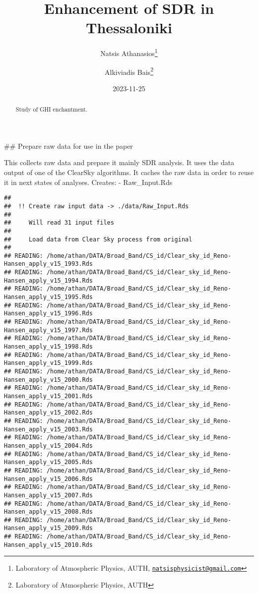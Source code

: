 \documentclass[
  10pt,
  a4paper,oneside]{article}
\title{Enhancement of SDR in Thessaloniki}
\author{Natsis Athanasios\footnote{Laboratory of Atmospheric Physics, AUTH, \href{mailto:natsisphysicist@gmail.com}{\nolinkurl{natsisphysicist@gmail.com}}} \and Alkiviadis Bais\footnote{Laboratory of Atmospheric Physics, AUTH}}
\date{2023-11-25}
\begin{document}
\maketitle
\begin{abstract}
Study of GHI enchantment.
\end{abstract}

{
\hypersetup{linkcolor=}
\setcounter{tocdepth}{4}
\tableofcontents
}
\#\# Prepare raw data for use in the paper

This collects raw data and prepare it mainly SDR analysis.
It uses the data output of one of the ClearSky algorithms.
It caches the raw data in order to reuse it in next states of analyses.
Creates:
- Raw\_Input.Rds

\begin{verbatim}
## 
##  !! Create raw input data -> ./data/Raw_Input.Rds 
## 
##     Will read 31 input files
## 
##     Load data from Clear Sky process from original
## 
## READING: /home/athan/DATA/Broad_Band/CS_id/Clear_sky_id_Reno-Hansen_apply_v15_1993.Rds 
## READING: /home/athan/DATA/Broad_Band/CS_id/Clear_sky_id_Reno-Hansen_apply_v15_1994.Rds 
## READING: /home/athan/DATA/Broad_Band/CS_id/Clear_sky_id_Reno-Hansen_apply_v15_1995.Rds 
## READING: /home/athan/DATA/Broad_Band/CS_id/Clear_sky_id_Reno-Hansen_apply_v15_1996.Rds 
## READING: /home/athan/DATA/Broad_Band/CS_id/Clear_sky_id_Reno-Hansen_apply_v15_1997.Rds 
## READING: /home/athan/DATA/Broad_Band/CS_id/Clear_sky_id_Reno-Hansen_apply_v15_1998.Rds 
## READING: /home/athan/DATA/Broad_Band/CS_id/Clear_sky_id_Reno-Hansen_apply_v15_1999.Rds 
## READING: /home/athan/DATA/Broad_Band/CS_id/Clear_sky_id_Reno-Hansen_apply_v15_2000.Rds 
## READING: /home/athan/DATA/Broad_Band/CS_id/Clear_sky_id_Reno-Hansen_apply_v15_2001.Rds 
## READING: /home/athan/DATA/Broad_Band/CS_id/Clear_sky_id_Reno-Hansen_apply_v15_2002.Rds 
## READING: /home/athan/DATA/Broad_Band/CS_id/Clear_sky_id_Reno-Hansen_apply_v15_2003.Rds 
## READING: /home/athan/DATA/Broad_Band/CS_id/Clear_sky_id_Reno-Hansen_apply_v15_2004.Rds 
## READING: /home/athan/DATA/Broad_Band/CS_id/Clear_sky_id_Reno-Hansen_apply_v15_2005.Rds 
## READING: /home/athan/DATA/Broad_Band/CS_id/Clear_sky_id_Reno-Hansen_apply_v15_2006.Rds 
## READING: /home/athan/DATA/Broad_Band/CS_id/Clear_sky_id_Reno-Hansen_apply_v15_2007.Rds 
## READING: /home/athan/DATA/Broad_Band/CS_id/Clear_sky_id_Reno-Hansen_apply_v15_2008.Rds 
## READING: /home/athan/DATA/Broad_Band/CS_id/Clear_sky_id_Reno-Hansen_apply_v15_2009.Rds 
## READING: /home/athan/DATA/Broad_Band/CS_id/Clear_sky_id_Reno-Hansen_apply_v15_2010.Rds 

\end{verbatim}
\end{document}
